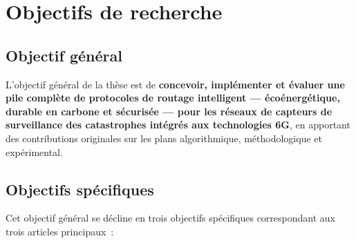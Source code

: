 \section{Objectifs de recherche}\label{sec:Objectifs}

\subsection{Objectif général}

L'objectif général de la thèse est de \textbf{concevoir, implémenter et évaluer une pile complète de protocoles de routage intelligent — écoénergétique, durable en carbone et sécurisée — pour les réseaux de capteurs de surveillance des catastrophes intégrés aux technologies 6G}, en apportant des contributions originales sur les plans algorithmique, méthodologique et expérimental\cite{freitag2021ict,saad2020vision6g,polese2023oran}.

\subsection{Objectifs spécifiques}

Cet objectif général se décline en trois objectifs spécifiques correspondant aux trois articles principaux~:


